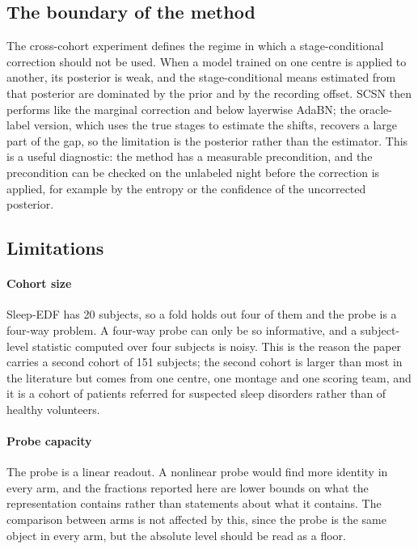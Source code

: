 \subsection{The boundary of the method}

The cross-cohort experiment defines the regime in which a stage-conditional
correction should not be used. When a model trained on one centre is applied
to another, its posterior is weak, and the stage-conditional means estimated
from that posterior are dominated by the prior and by the recording offset.
SCSN then performs like the marginal correction and below layerwise AdaBN; the
oracle-label version, which uses the true stages to estimate the shifts,
recovers a large part of the gap, so the limitation is the posterior rather
than the estimator. This is a useful diagnostic: the method has a measurable
precondition, and the precondition can be checked on the unlabeled night
before the correction is applied, for example by the entropy or the
confidence of the uncorrected posterior.

\subsection{Limitations}

\paragraph{Cohort size}
Sleep-EDF has 20 subjects, so a fold holds out four of them and the probe is a
four-way problem. A four-way probe can only be so informative, and a
subject-level statistic computed over four subjects is noisy. This is the
reason the paper carries a second cohort of 151 subjects; the second cohort is
larger than most in the literature but comes from one centre, one montage and
one scoring team, and it is a cohort of patients referred for suspected sleep
disorders rather than of healthy volunteers.

\paragraph{Probe capacity}
The probe is a linear readout. A nonlinear probe would find more identity in
every arm, and the fractions reported here are lower bounds on what the
representation contains rather than statements about what it contains. The
comparison between arms is not affected by this, since the probe is the same
object in every arm, but the absolute level should be read as a floor.

